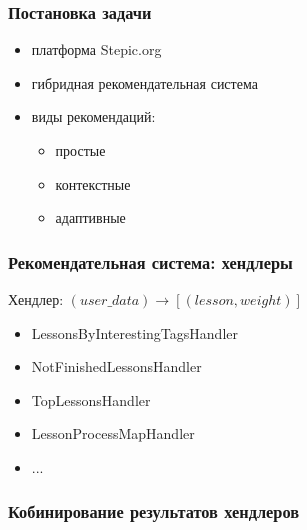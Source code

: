 \documentclass{beamer}
\begin{document}
\begin{frame}\frametitle{Постановка задачи}
\Large

\begin{itemize}
    \item платформа Stepic.org
    \smallskip
    \item гибридная рекомендательная система
    \bigskip
    \item виды рекомендаций:
        \begin{itemize}
            \large
            \item простые 
            \item контекстные 
            \item адаптивные 
        \end{itemize}
\end{itemize}
    
\end{frame}

\begin{frame}\frametitle{Рекомендательная система: хендлеры}
\bigskip
Хендлер: $(user\_data) \rightarrow [(lesson, weight)]$

    \begin{itemize}
        \item LessonsByInterestingTagsHandler
        \smallskip
        \item NotFinishedLessonsHandler
        \smallskip
        \item TopLessonsHandler
        \smallskip
        \item LessonProcessMapHandler
        \smallskip
        \item ...
    \end{itemize}

\end{frame}


\begin{frame}\frametitle{Кобинирование результатов хендлеров}

    \begin{figure}[H]
    \end{figure}

\end{frame}
\end{document}
